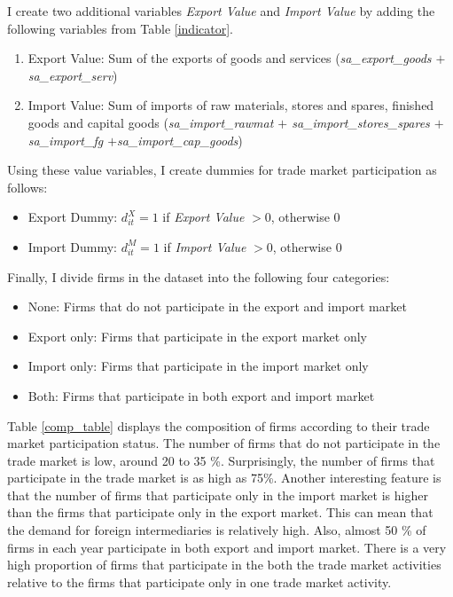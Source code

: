 \documentclass[12pt]{article}
\begin{document}
I create two additional variables \textit{Export Value} and
\textit{Import Value}
by adding the following variables from Table \ref{indicator}.  
\begin{enumerate}
\item Export Value: Sum of the exports of goods and services (\textit{sa\_export\_goods $+$ sa\_export\_serv})
\item Import Value: Sum of imports of raw materials, stores and spares,
  finished goods and capital goods (\textit{sa\_import\_rawmat $+$        sa\_import\_stores\_spares
  $+$ sa\_import\_fg            $+$sa\_import\_cap\_goods})
\end{enumerate}
Using these value variables, I create dummies for trade market
participation as follows:
\begin{itemize}
\item Export Dummy: $d_{it}^{X}=1$ if \textit{Export Value} $> 0$,
  otherwise $0$
\item Import Dummy: $d_{it}^{M}=1$ if \textit{Import Value} $> 0$, otherwise $0$
\end{itemize} 

Finally, I divide firms in the dataset into the following four categories:
\begin{itemize}
\item None: Firms that do not participate in the export and import
  market 
\item Export only: Firms that participate in the export market only
\item Import only: Firms that participate in the import market only
\item Both: Firms that participate in both export and import market
\end{itemize}

Table \ref{comp_table} displays the composition of firms according to their trade market
participation status. The number of firms that do not
participate in the trade market is low, around 20 to 35
\%. Surprisingly, the number of firms that participate in the trade
market is as high as 75\%. Another interesting feature is that the number
of firms that participate only in the import market is higher than the
firms that participate only in the export market. This can mean that
the demand for foreign intermediaries is relatively high. Also, almost 50 \% of
firms in each year participate in both export and import market. There is
a very high proportion of firms that participate in the both the trade market activities relative to the firms that
participate only in one trade market activity. 
\end{document}
